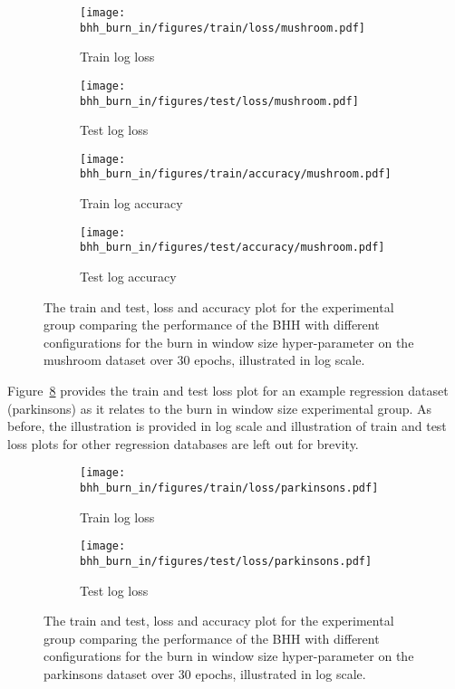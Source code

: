 \begin{figure}[htbp]
	\begin{subfigure}{0.5\textwidth}
		\centering
		\texttt{[image: bhh\_burn\_in/figures/train/loss/mushroom.pdf]}
		\caption{Train log loss}
		\label{fig:results:burn_in:figures:loss:train:mushroom}
	\end{subfigure}
	\begin{subfigure}{0.5\textwidth}
		\centering
		\texttt{[image: bhh\_burn\_in/figures/test/loss/mushroom.pdf]}
		\caption{Test log loss}
		\label{fig:results:burn_in:figures:loss:test:mushroom}
	\end{subfigure}
	\par\bigskip
	\begin{subfigure}{0.5\textwidth}
		\centering
		\texttt{[image: bhh\_burn\_in/figures/train/accuracy/mushroom.pdf]}
		\caption{Train log accuracy}
		\label{fig:results:burn_in:figures:accuracy:train:mushroom}
	\end{subfigure}
	\begin{subfigure}{0.5\textwidth}
		\centering
		\texttt{[image: bhh\_burn\_in/figures/test/accuracy/mushroom.pdf]}
		\caption{Test log accuracy}
		\label{fig:results:burn_in:figures:accuracy:test:mushroom}
	\end{subfigure}
	\par\bigskip
	\caption{The train and test, loss and accuracy plot for the experimental group comparing the performance of the \acs{BHH} with different configurations for the burn in window size hyper-parameter on the mushroom dataset over 30 epochs, illustrated in log scale.}
	\label{fig:results:burn_in:figures:mushroom}
\end{figure}

Figure~\ref{fig:results:burn_in:figures:parkinsons} provides the train and test loss plot for an example regression dataset (parkinsons) as it relates to the burn in window size experimental group. As before, the illustration is provided in log scale and illustration of train and test loss plots for other regression databases are left out for brevity.

\begin{figure}[htbp]
	\begin{subfigure}{0.5\textwidth}
		\centering
		\texttt{[image: bhh\_burn\_in/figures/train/loss/parkinsons.pdf]}
		\caption{Train log loss}
		\label{fig:results:burn_in:figures:loss:train:parkinsons}
	\end{subfigure}
	\begin{subfigure}{0.5\textwidth}
		\centering
		\texttt{[image: bhh\_burn\_in/figures/test/loss/parkinsons.pdf]}
		\caption{Test log loss}
		\label{fig:results:burn_in:figures:loss:test:parkinsons}
	\end{subfigure}
	\par\bigskip
	\caption{The train and test, loss and accuracy plot for the experimental group comparing the performance of the \acs{BHH} with different configurations for the burn in window size hyper-parameter on the parkinsons dataset over 30 epochs, illustrated in log scale.}
	\label{fig:results:burn_in:figures:parkinsons}
\end{figure}

